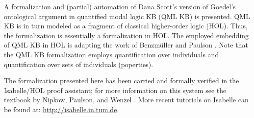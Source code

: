 %
\begin{isabellebody}%
\def\isabellecontext{GoedelGod}%
%
\isadelimtheory
%
\endisadelimtheory
%
\isatagtheory
%
\endisatagtheory
{\isafoldtheory}%
%
\isadelimtheory
%
\endisadelimtheory
%
\isamarkuptrue%
%
\begin{isamarkuptext}%
A formalization and (partial) automation of Dana Scott's version \cite{ScottNotes}
 of Goedel's ontological argument \cite{GoedelNotes} in quantified modal logic KB (QML KB) is presented. 
 QML KB is in turn modeled as a fragment of classical higher-order logic (HOL). 
 Thus, the formalization is essentially a formalization in HOL. The employed embedding 
 of QML KB in HOL is adapting the work of Benzm\"uller and Paulson \cite{J23,B9}.
 Note that the QML KB formalization employs quantification over individuals and 
 quantification over sets of individuals (poperties).

 The formalization presented here has been carried and formally verified in the Isabelle/HOL 
 proof assistant; for more information on this system see the textbook by Nipkow, 
 Paulson, and Wenzel \cite{Isabelle}. More recent tutorials on Isabelle can be found 
 at: \url{http://isabelle.in.tum.de}.
 


\end{isamarkuptext}
\end{isabellebody}
